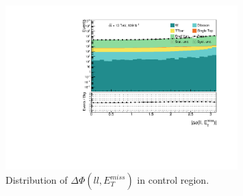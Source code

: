 \documentclass[14pt, a4paper]{book}
\begin{document}
\begin{figure}[!ht]
    \centering
        \includegraphics[width=0.8\textwidth]{dPhiLLMET.pdf}
    \caption{Distribution of $\Delta\Phi(ll,E_T^{miss})$ in control region.}\label{fig:dPhiLLMET_dist}
\end{figure}
\end{document}
